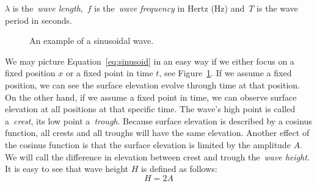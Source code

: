 $\lambda$ is the~\emph{wave length},~$f$ is the~\emph{wave frequency} in Hertz (Hz) and~$T$
is the wave period in seconds.
%
\begin{figure}
\centering
\caption{An example of a sinusoidal wave.}
\label{fig:sinusoid}
\end{figure}
%
We may picture Equation~\ref{eq:sinusoid} in an easy way if we either focus on a
fixed position $x$ or a fixed point in time $t$, see Figure~\ref{fig:sinusoid}.
If we assume a fixed position, we can see the surface elevation evolve through
time at that position. On the other hand, if we assume a fixed point in time, we
can observe surface elevation at all positions at that specific time. The wave's
high point is called a~\emph{crest}, its low point a~\emph{trough}. Because
surface elevation is described by a cosinus function, all crests and all troughs
will have the same elevation. Another effect of the cosinus function is that the
surface elevation is limited by the amplitude $A$. We will call the difference
in elevation between crest and trough the~\emph{wave height}. It is easy to see
that wave height $H$ is defined as follows:
\begin{equation}
 H = 2A
\end{equation}
%

